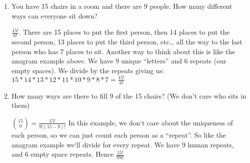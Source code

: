 \question 
\begin{enumerate}[label=(\alph*)]
\item
You have 15 chairs in a room and there are 9 people. How many different 
ways can everyone sit down?
\begin{solution}[1 in]
$\frac{15!}{6!}$.
There are 15 places to put the first person, then 14 places to put the 
second person, 13 places to put the third person, etc… all the way to 
the last person who has 7 places to sit.
Another way to think about this is like the anagram example above. We 
have 9 unique “letters” and 6 repeats (our empty spaces). We divide by 
the repeats giving us:
$15*14*13*12*11*10*9*8*7 = \frac{15!}{6!}$
 \end{solution}
 
\item How many ways are there to fill 9 of the 15 chairs? (We don’t 
care who sits in them)

\begin{solution}
${15 \choose 9}  = \frac{15!}{9!(15-9)!}$
In this example, we don`t care about the uniqueness of each person, 
so we can just count each person as a “repeat”. So like the anagram 
example we`ll divide for every repeat. We have 9 human repeats, and 
6 empty space repeats. Hence $\frac{15!}{9!6!}$
\end{solution}

\end{enumerate}